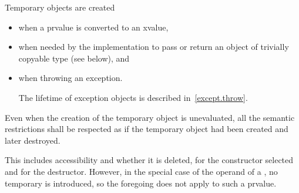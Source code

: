 \pnum
{}%
%
%
%
%
Temporary objects are created
\begin{itemize}
\item
when a prvalue is converted to an xvalue,
\item
when needed by the implementation to pass or return an object of trivially copyable type (see below),
and
\item
when throwing an exception.
\begin{note}
The lifetime of exception objects is described in~\ref{except.throw}.
\end{note}
\end{itemize}
Even when the creation of the temporary object is
unevaluated,
all the semantic restrictions shall be respected as if the temporary object
had been created and later destroyed.
\begin{note}
This includes accessibility and whether it is deleted,
for the constructor selected and for the destructor. However, in the special
case of the operand of a
, no temporary is introduced,
so the foregoing does not apply to such a prvalue.
\end{note}

